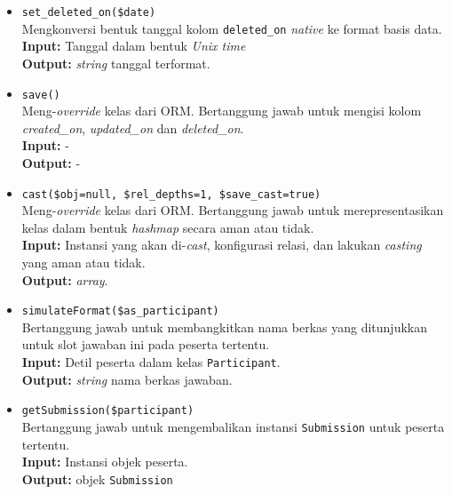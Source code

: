 \begin{itemize}
\begin{itemize}
                \item \texttt{set\_deleted\_on(\$date)} \\
                    Mengkonversi bentuk tanggal kolom \texttt{deleted\_on}
                    \textit{native} ke format basis data. \\
                    \textbf{Input:} Tanggal dalam bentuk \textit{Unix time}\\
                    \textbf{Output:} \textit{string} tanggal terformat.
                    
                \item \texttt{save()}\\
                    Meng-\textit{override} kelas dari ORM. Bertanggung jawab
                    untuk mengisi kolom \textit{created\_on},
                    \textit{updated\_on} dan \textit{deleted\_on}.\\
                    \textbf{Input:} -\\
                    \textbf{Output:} -
                
                \item \texttt{cast(\$obj=null, \$rel\_depths=1,
                \$save\_cast=true)}\\
                    Meng-\textit{override} kelas dari ORM. Bertanggung jawab
                    untuk merepresentasikan kelas dalam bentuk \textit{hashmap}
                    secara aman atau tidak. \\
                    \textbf{Input:} Instansi yang akan di-\textit{cast},
                        konfigurasi relasi, dan lakukan \textit{casting} yang
                        aman atau tidak.\\
                    \textbf{Output:} \textit{array}.
                    
                \item \texttt{simulateFormat(\$as\_participant)} \\
                    Bertanggung jawab untuk membangkitkan nama berkas yang
                    ditunjukkan untuk slot jawaban ini pada peserta tertentu. \\
                    \textbf{Input:} Detil peserta dalam kelas
                    \texttt{Participant}.\\
                    \textbf{Output:} \textit{string} nama berkas jawaban.
                    
                \item \texttt{getSubmission(\$participant)} \\
                    Bertanggung jawab untuk mengembalikan instansi
                    \texttt{Submission} untuk peserta tertentu. \\
                    \textbf{Input:} Instansi objek peserta.\\
                    \textbf{Output:} objek \texttt{Submission}
                    

\end{itemize}
\end{itemize}

